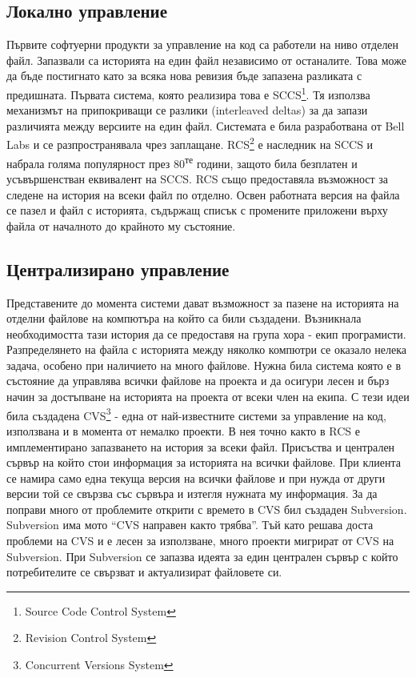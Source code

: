 \documentclass[a4paper]{article}
\begin{document}
  \subsection{Локално управление}
  Първите софтуерни продукти за управление на код са работели на ниво отделен
  файл. Запазвали са историята на един файл независимо от останалите.  Това
  може да бъде постигнато като за всяка нова ревизия бъде запазена разликата
  с предишната. Първата система, която реализира това е SCCS\footnote{Source
  Code Control System\cite{sccs}}. Тя използва механизмът на припокриващи се
  разлики (interleaved deltas) за да запази различията между версиите на един
  файл. Системата е била разработвана от Bell Labs и се разпространявала чрез
  заплащане. RCS\footnote{Revision Control System\cite{rcs}} е наследник на
  SCCS и набрала голяма популярност през 80\textsuperscript{те} години, защото
  била безплатен и усъвършенстван еквивалент на SCCS. RCS също предоставяла
  възможност за следене на история на всеки файл по отделно. Освен работната
  версия на файла се пазел и файл с историята, съдържащ списък с промените
  приложени върху файла от началното до крайното му състояние.

  \subsection{Централизирано управление} Представените до момента системи дават
  възможност за пазене на историята на отделни файлове на компютъра на който са
  били създадени. Възникнала необходимостта тази история да се предоставя на
  група хора - екип програмисти. Разпределянето на файла с историята между
  няколко компютри се оказало нелека задача, особено при наличието на много
  файлове. Нужна била система която е в състояние да управлява всички файлове
  на проекта и да осигури лесен и бърз начин за достъпване на историята на
  проекта от всеки член на екипа. С тези идеи била създадена
  CVS\footnote{Concurrent Versions System\cite{cvs}} - една от най-известните
  системи за управление на код, използвана и в момента от немалко проекти.
  В нея точно както в RCS е имплементирано запазването на история за всеки
  файл. Присъства и централен сървър на който стои информация за историята на
  всички файлове. При клиента се намира само една текуща версия на всички
  файлове и при нужда от други версии той се свързва със сървъра и изтегля
  нужната му информация. За да поправи много от проблемите открити с времето
  в CVS бил създаден Subversion\cite{svn}. Subversion има мото ``CVS направен
  както трябва''. Тъй като решава доста проблеми на CVS и е лесен за използване,
  много проекти мигрират от CVS на Subversion. При Subversion се запазва идеята
  за един централен сървър с който потребителите се свързват и актуализират
  файловете си.
\end{document}
